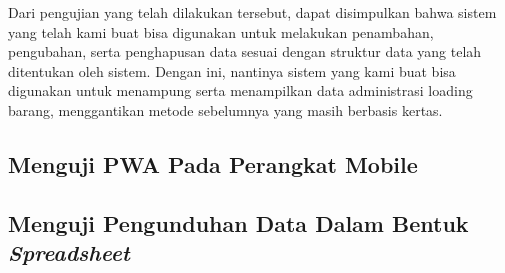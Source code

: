 Dari pengujian yang telah dilakukan tersebut, dapat disimpulkan bahwa sistem yang telah kami buat bisa digunakan untuk melakukan penambahan, pengubahan, serta penghapusan data sesuai dengan struktur data yang telah ditentukan oleh sistem.
Dengan ini, nantinya sistem yang kami buat bisa digunakan untuk menampung serta menampilkan data administrasi loading barang, menggantikan metode sebelumnya yang masih berbasis kertas.
\vspace{0.5ex}

\subsection{Menguji PWA Pada Perangkat Mobile}
\vspace{1ex}

\lipsum[4]
\vspace{0.5ex}

\subsection{Menguji Pengunduhan Data Dalam Bentuk \emph{Spreadsheet}}
\vspace{1ex}

\lipsum[4]
\vspace{0.5ex}